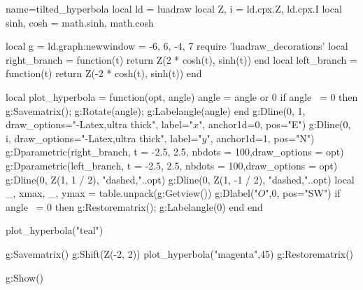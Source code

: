 \documentclass{standalone}
\begin{document}
\begin{luadraw}{name=tilted_hyperbola}
local ld = luadraw
local Z, i = ld.cpx.Z, ld.cpx.I
local sinh, cosh = math.sinh, math.cosh

local g = ld.graph:new{window = {-6, 6, -4, 7}}
require 'luadraw_decorations'
local right_branch = function(t) return Z(2 * cosh(t), sinh(t)) end
local left_branch = function(t) return Z(-2 * cosh(t), sinh(t)) end

local plot_hyperbola = function(opt, angle)
    angle = angle or 0
    if angle ~= 0 then 
        g:Savematrix(); g:Rotate(angle); g:Labelangle(angle)
    end
    g:Dline({0, 1}, {draw_options="-Latex,ultra thick", label="$x$", anchor1d=0, pos="E"})
    g:Dline({0, i}, {draw_options="-Latex,ultra thick", label="$y$", anchor1d=1, pos="N"})
    g:Dparametric(right_branch, {t = {-2.5, 2.5}, nbdots = 100,draw_options = opt})
    g:Dparametric(left_branch, {t = {-2.5, 2.5}, nbdots = 100,draw_options = opt})
    g:Dline({0, Z(1, 1 / 2)}, "dashed,"..opt)
    g:Dline({0, Z(1, -1 / 2)}, "dashed,"..opt)
    local _, xmax, _, ymax = table.unpack(g:Getview())
    g:Dlabel("$O$",0, {pos="SW"})
    if angle ~= 0 then g:Restorematrix(); g:Labelangle(0)  end
end

plot_hyperbola("teal")

g:Savematrix()
g:Shift(Z(-2, 2))
plot_hyperbola("magenta",45)
g:Restorematrix()

g:Show()
\end{luadraw}
\end{document}
